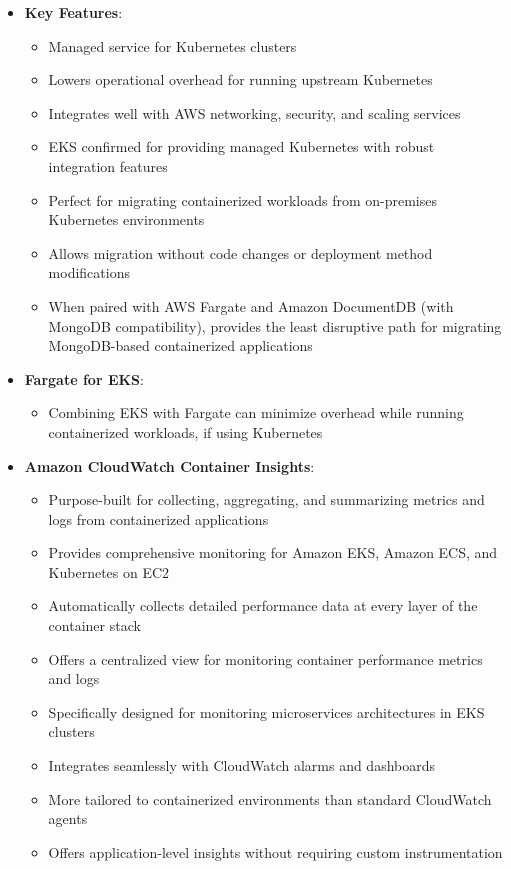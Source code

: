\documentclass[11pt,a4paper]{report}
\begin{document}
\begin{itemize}
  \item \textbf{Key Features}:
\begin{itemize}
  \item Managed service for Kubernetes clusters
  \item Lowers operational overhead for running upstream Kubernetes
  \item Integrates well with AWS networking, security, and scaling services
  \item EKS confirmed for providing managed Kubernetes with robust integration features
  \item Perfect for migrating containerized workloads from on-premises Kubernetes environments
  \item Allows migration without code changes or deployment method modifications
  \item When paired with AWS Fargate and Amazon DocumentDB (with MongoDB compatibility), provides the least disruptive path for migrating MongoDB-based containerized applications
\end{itemize}
  \item \textbf{Fargate for EKS}:
\begin{itemize}
  \item Combining EKS with Fargate can minimize overhead while running containerized workloads, if using Kubernetes
\end{itemize}
  \item \textbf{Amazon CloudWatch Container Insights}:
\begin{itemize}
  \item Purpose-built for collecting, aggregating, and summarizing metrics and logs from containerized applications
  \item Provides comprehensive monitoring for Amazon EKS, Amazon ECS, and Kubernetes on EC2
  \item Automatically collects detailed performance data at every layer of the container stack
  \item Offers a centralized view for monitoring container performance metrics and logs
  \item Specifically designed for monitoring microservices architectures in EKS clusters
  \item Integrates seamlessly with CloudWatch alarms and dashboards
  \item More tailored to containerized environments than standard CloudWatch agents
  \item Offers application-level insights without requiring custom instrumentation

\end{itemize}
\end{itemize}
\end{document}

